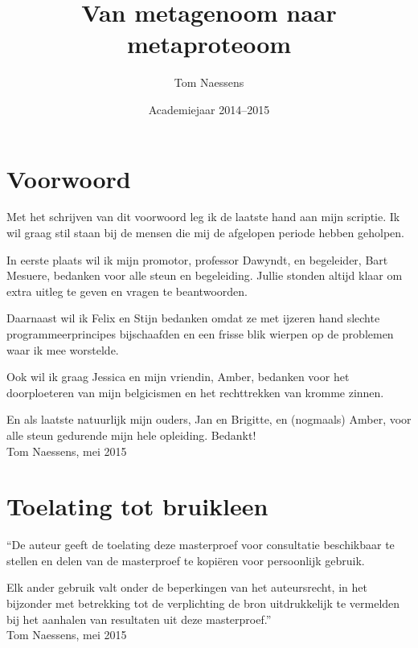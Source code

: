 \documentclass[12pt,a4paper,dutch]{report}
\title{Van metagenoom naar metaproteoom}
\date{Academiejaar 2014--2015}
\author{Tom Naessens}
\theoremstyle{definition}
\newcommand\blankpage{%
    \null
    \thispagestyle{empty}%
    \addtocounter{page}{-1}%
    \newpage}
\begin{document}

\afterpage{\blankpage} 



\chapter*{Voorwoord}
Met het schrijven van dit voorwoord leg ik de laatste hand aan mijn scriptie. 
Ik wil graag stil staan bij de mensen die mij de afgelopen periode hebben 
geholpen.

In eerste plaats wil ik mijn promotor, professor Dawyndt, en begeleider, Bart 
Mesuere, bedanken voor alle steun en begeleiding. Jullie stonden altijd klaar 
om extra uitleg te geven en vragen te beantwoorden.

Daarnaast wil ik Felix en Stijn bedanken omdat ze met ijzeren hand slechte 
programmeerprincipes bijschaafden en een frisse blik wierpen op de problemen 
waar ik mee worstelde.

Ook wil ik graag Jessica en mijn vriendin, Amber, bedanken voor het 
doorploeteren van mijn belgicismen en het rechttrekken van kromme zinnen.

En als laatste natuurlijk mijn ouders, Jan en Brigitte, en (nogmaals) Amber, 
voor alle steun gedurende mijn hele opleiding. Bedankt!\\

Tom Naessens, mei 2015



\chapter*{Toelating tot bruikleen} 

``De auteur geeft de toelating deze masterproef voor consultatie beschikbaar te
stellen en delen van de masterproef te kopiëren voor persoonlijk gebruik.

Elk ander gebruik valt onder de beperkingen van het auteursrecht, in het
bijzonder met betrekking tot de verplichting de bron uitdrukkelijk te vermelden
bij het aanhalen van resultaten uit deze masterproef.''\\

Tom Naessens, mei 2015

\clearpage
\end{document}
